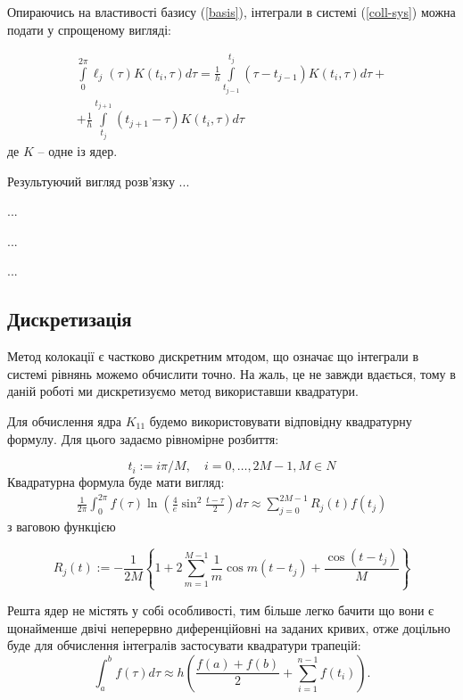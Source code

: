 \documentclass[14pt,a4paper]{extarticle}
\newcounter{e}
\numberwithin{equation}{section}
\newcommand{\intl}{\int\limits}
\newcommand{\inttwopi}{\intl_{0}^{2\pi}}
\begin{document}
 Опираючись на властивості базису (\ref{basis}), інтеграли в системі (\ref{coll-sys}) можна подати у спрощеному вигляді:
 
 \begin{equation}
 	\begin{matrix}
 	\displaystyle
 	\inttwopi \ell_{j}(\tau) K\left(t_{i}, \tau\right) d \tau=\frac{1}{h} \intl_{t_{j-1}}^{t_{j}}\left(\tau-t_{j-1}\right) K\left(t_{i}, \tau\right) d \tau + \\
 	\displaystyle
 	+\frac{1}{h} \intl_{t_{j}}^{t_{j+1}}\left(t_{j+1}-\tau\right) K\left(t_{i}, \tau\right) d \tau
 	\end{matrix}
 \end{equation}
 де $K$ -- одне із ядер.
 
 Результуючий вигляд розв'язку ...
 
 ...
 
 ...
 
 ...
 
 
 \subsection{Дискретизація}
 Метод колокації є частково дискретним мтодом, що означає що інтеграли в системі рівнянь можемо обчислити точно. На жаль, це не завжди вдається, тому в даній роботі ми дискретизуємо метод використавши квадратури.

Для обчислення ядра $K_{11}$ будемо використовувати відповідну квадратурну формулу. Для цього задаємо рівномірне розбиття:

$$
t_{i}:=i \pi / M, \quad i=0, \ldots, 2 M-1, M \in N
$$
Квадратурна формула буде мати вигляд:
\begin{eqnarray}
	\frac{1}{2 \pi} \int_{0}^{2 \pi} f(\tau) \ln \left(\frac{4}{e} \sin ^{2} \frac{t-\tau}{2}\right) d \tau \approx \sum_{j=0}^{2 M-1} R_{j}(t) f\left(t_{j}\right)
\end{eqnarray}
з ваговою функцією

\begin{equation}
	R_{j}(t):=-\frac{1}{2 M}\left\{1+2 \sum_{m=1}^{M-1} \frac{1}{m} \cos m\left(t-t_{j}\right)+\frac{\cos \left(t-t_{j}\right)}{M}\right\}
\end{equation} 

 Решта ядер не містять у собі особливості, тим більше легко бачити що вони є щонайменше двічі неперервно диференційовні на заданих кривих, отже доцільно буде для обчислення інтегралів застосувати квадратури трапецій:
 \begin{equation}
 	\displaystyle
 	\int_{a}^{b} f(\tau) d \tau \approx h \left(\frac{f(a)+f(b)}{2}+\sum_{i=1}^{n-1} f\left(t_{i}\right)\right).
 \end{equation}
 
\end{document}
